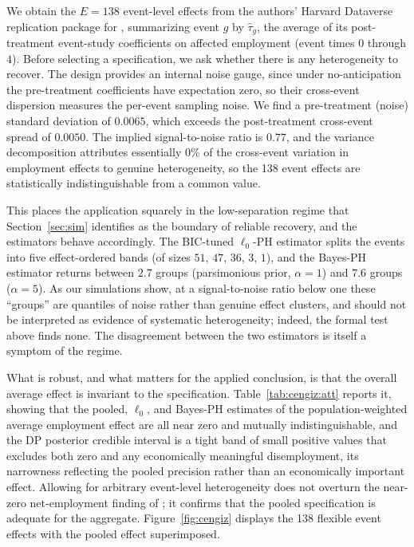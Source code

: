 \documentclass[margin=5in, 12pt]{article}
\newcommand{\1}{\mathbbm{1}}
\begin{document}
We obtain the $E = 138$ event-level effects from the authors' Harvard Dataverse replication package for \citet{cengiz2019}, summarizing event $g$ by $\hat\tau_g$, the average of its post-treatment event-study coefficients on affected employment (event times $0$ through $4$). Before selecting a specification, we ask whether there is any heterogeneity to recover. The design provides an internal noise gauge, since under no-anticipation the pre-treatment coefficients have expectation zero, so their cross-event dispersion measures the per-event sampling noise. We find a pre-treatment (noise) standard deviation of $0.0065$, which exceeds the post-treatment cross-event spread of $0.0050$. The implied signal-to-noise ratio is $0.77$, and the variance decomposition attributes essentially $0\%$ of the cross-event variation in employment effects to genuine heterogeneity, so the 138 event effects are statistically indistinguishable from a common value.

This places the application squarely in the low-separation regime that Section~\ref{sec:sim} identifies as the boundary of reliable recovery, and the estimators behave accordingly. The BIC-tuned $\ell_0$-PH estimator splits the events into five effect-ordered bands (of sizes $51$, $47$, $36$, $3$, $1$), and the Bayes-PH estimator returns between $2.7$ groups (parsimonious prior, $\alpha=1$) and $7.6$ groups ($\alpha=5$). As our simulations show, at a signal-to-noise ratio below one these ``groups'' are quantiles of noise rather than genuine effect clusters, and should not be interpreted as evidence of systematic heterogeneity; indeed, the formal test above finds none. The disagreement between the two estimators is itself a symptom of the regime.

What is robust, and what matters for the applied conclusion, is that the overall average effect is invariant to the specification. Table~\ref{tab:cengiz:att} reports it, showing that the pooled, $\ell_0$, and Bayes-PH estimates of the population-weighted average employment effect are all near zero and mutually indistinguishable, and the DP posterior credible interval is a tight band of small positive values that excludes both zero and any economically meaningful disemployment, its narrowness reflecting the pooled precision rather than an economically important effect. Allowing for arbitrary event-level heterogeneity does not overturn the near-zero net-employment finding of \citet{cengiz2019}; it confirms that the pooled specification is adequate for the aggregate. Figure~\ref{fig:cengiz} displays the 138 flexible event effects with the pooled effect superimposed.
\end{document}
